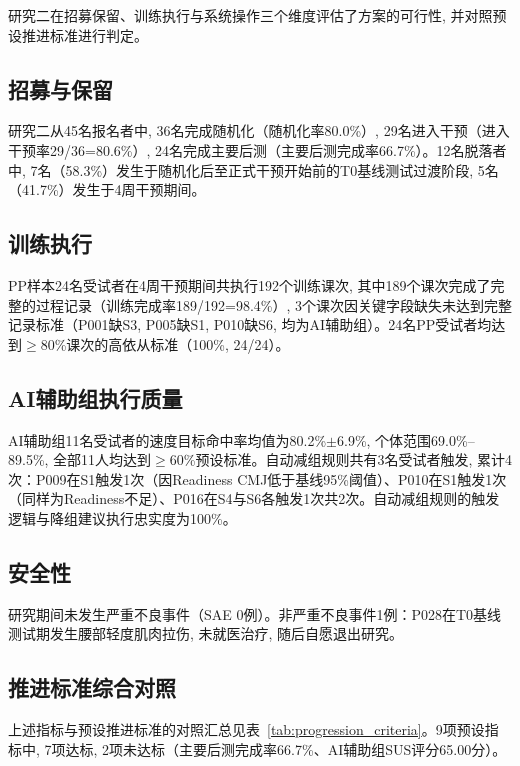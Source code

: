研究二在招募保留、训练执行与系统操作三个维度评估了方案的可行性, 并对照预设推进标准进行判定。

\subsection{招募与保留}
\label{sec:recruitment}

研究二从45名报名者中, 36名完成随机化（随机化率80.0\%）, 29名进入干预（进入干预率29/36=80.6\%）, 24名完成主要后测（主要后测完成率66.7\%）。12名脱落者中, 7名（58.3\%）发生于随机化后至正式干预开始前的T0基线测试过渡阶段, 5名（41.7\%）发生于4周干预期间。

\subsection{训练执行}
\label{sec:training_execution}

PP样本24名受试者在4周干预期间共执行192个训练课次, 其中189个课次完成了完整的过程记录（训练完成率189/192=98.4\%）, 3个课次因关键字段缺失未达到完整记录标准（P001缺S3, P005缺S1, P010缺S6, 均为AI辅助组）。24名PP受试者均达到$\geq$80\%课次的高依从标准（100\%, 24/24）。

\subsection{AI辅助组执行质量}
\label{sec:ai_execution}

AI辅助组11名受试者的速度目标命中率均值为80.2\%$\pm$6.9\%, 个体范围69.0\%--89.5\%, 全部11人均达到$\geq$60\%预设标准。自动减组规则共有3名受试者触发, 累计4次：P009在S1触发1次（因Readiness CMJ低于基线95\%阈值）、P010在S1触发1次（同样为Readiness不足）、P016在S4与S6各触发1次共2次。\allowbreak 自动减组规则的触发逻辑与降组建议执行忠实度为100\%。

\subsection{安全性}
\label{sec:safety}

研究期间未发生严重不良事件（SAE 0例）。非严重不良事件1例：P028在T0基线测试期发生腰部轻度肌肉拉伤, 未就医治疗, 随后自愿退出研究。

\subsection{推进标准综合对照}
\label{sec:criteria}

上述指标与预设推进标准的对照汇总见表~\ref{tab:progression_criteria}。9项预设指标中, 7项达标, 2项未达标（主要后测完成率66.7\%、AI辅助组SUS评分65.00分）。\allowbreak

